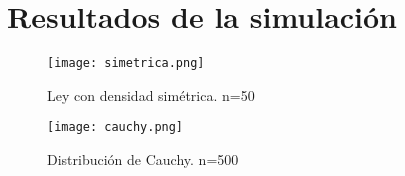 \documentclass[a5paper]{article}
\begin{document}
\newpage

\section{ Resultados de la simulación }

\begin{figure}[h]
\centering
\texttt{[image: simetrica.png]}%
\caption{Ley con densidad simétrica. n=50}
\label{contexto:figura}
\end{figure}

\begin{figure}[h]
\centering
\texttt{[image: cauchy.png]}%
\caption{Distribución de Cauchy. n=500}
\label{contexto:figura}

\end{figure}

\newpage
\end{document}
